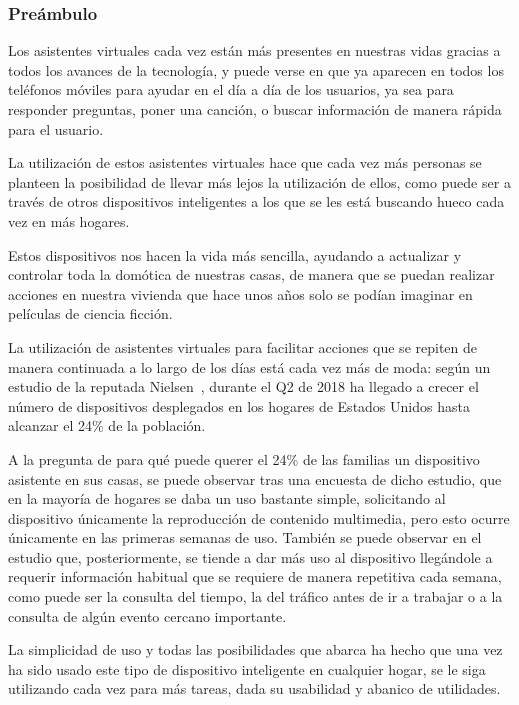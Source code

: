 \subsubsection{Preámbulo}

Los asistentes virtuales cada vez están más presentes en nuestras vidas gracias a todos los avances de la tecnología, y puede verse en que ya aparecen en todos los teléfonos móviles para ayudar en el día a día de los usuarios, ya sea para responder preguntas, poner una canción, o buscar información de manera rápida para el usuario.

La utilización de estos asistentes virtuales hace que cada vez más personas se planteen la posibilidad de llevar más lejos la utilización de ellos, como puede ser a través de otros dispositivos inteligentes a los que se les está buscando hueco cada vez en más hogares.

Estos dispositivos nos hacen la vida más sencilla, ayudando a actualizar y controlar toda la domótica de nuestras casas, de manera que se puedan realizar acciones en nuestra vivienda que hace unos años solo se podían imaginar en películas de ciencia ficción.

La utilización de asistentes virtuales para facilitar acciones que se repiten de manera continuada a lo largo de los días está cada vez más de moda: según un estudio de la reputada Nielsen~\cite{nielsen}, durante el Q2 de 2018 ha llegado a crecer el número de dispositivos desplegados en los hogares de Estados Unidos hasta alcanzar el 24\% de la población.

A la pregunta de para qué puede querer el 24\% de las familias un dispositivo asistente en sus casas, se puede observar tras una encuesta de dicho estudio, que en la mayoría de hogares se daba un uso bastante simple, solicitando al dispositivo únicamente la reproducción de contenido multimedia, pero esto ocurre únicamente en las primeras semanas de uso. También se puede observar en el estudio que, posteriormente, se tiende a dar más uso al dispositivo llegándole a requerir información habitual que se requiere de manera repetitiva cada semana, como puede ser la consulta del tiempo, la del tráfico antes de ir a trabajar o a la consulta de algún evento cercano importante.

La simplicidad de uso y todas las posibilidades que abarca ha hecho que una vez ha sido usado este tipo de dispositivo inteligente en cualquier hogar, se le siga utilizando cada vez para más tareas, dada su usabilidad y abanico de utilidades.

